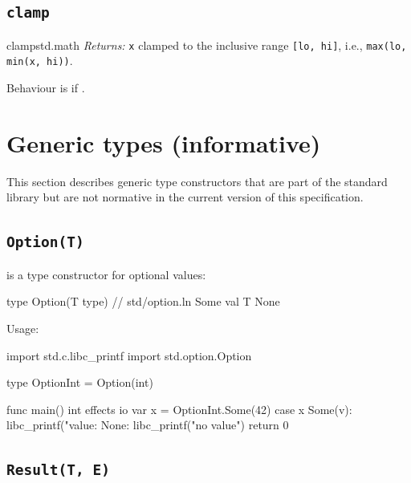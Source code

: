 \subsection{\texttt{clamp}}
\label{sec:stdlib.math.clamp}

\begin{functionspec}{clamp}{std.math}
\noindent\textit{Returns:} \texttt{x} clamped to the inclusive range
\texttt{[lo, hi]}, i.e.,
\texttt{max(lo, min(x, hi))}.
\end{functionspec}

\begin{constraint}
  Behaviour is  if .
\end{constraint}

\section{Generic types (informative)}
\label{sec:stdlib.generic}

\pnum
This section describes generic type constructors that are part of the
standard library but are not normative in the current version of this
specification.

\subsection{\texttt{Option(T)}}
\label{sec:stdlib.option}

\pnum
{} is a type constructor for optional values:

\begin{laincode}
type Option(T type) {          // std/option.ln
    Some { val T }
    None
}
\end{laincode}

\pnum
Usage:

\begin{laincode}
import std.c.{libc_printf}
import std.option.{Option}

type OptionInt = Option(int)

func main() int effects io {
    var x = OptionInt.Some(42)
    case x {
        Some(v): libc_printf("value: %
        None:    libc_printf("no value\n")
    }
    return 0
}
\end{laincode}

\subsection{\texttt{Result(T, E)}}
\label{sec:stdlib.result}

